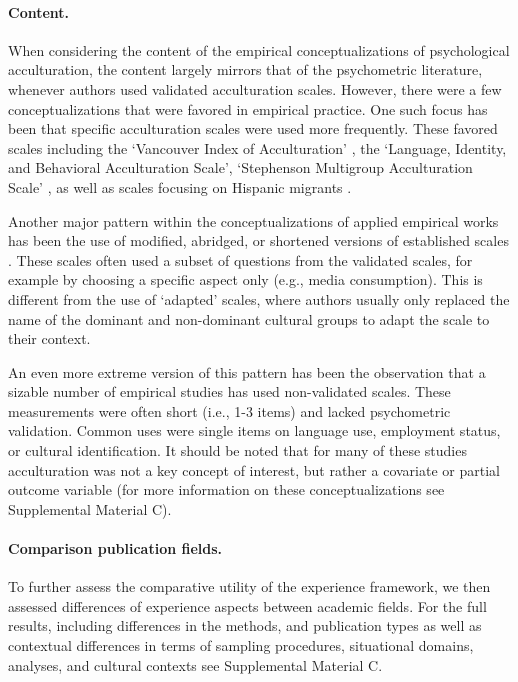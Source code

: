 \documentclass[man, 12pt, a4paper, mask]{apa7}
\begin{document}
\paragraph{Content.}

When considering the content of the empirical conceptualizations of
psychological acculturation, the content largely mirrors that of the
psychometric literature, whenever authors used validated acculturation
scales. However, there were a few conceptualizations that were favored
in empirical practice. One such focus has been that specific
acculturation scales were used more frequently. These favored scales
including the `Vancouver Index of Acculturation' \citep[][]{Ryder2000},
the `Language, Identity, and Behavioral Acculturation Scale',
`Stephenson Multigroup Acculturation Scale' \citep[][]{Stephenson2000},
as well as scales focusing on Hispanic migrants
\citep[][]{Cuellar1995a, Marin1987, Marin1987}.

Another major pattern within the conceptualizations of applied empirical
works has been the use of modified, abridged, or shortened versions of
established scales \citep[e.g.,][]{Green2014,Im2009}. These scales often
used a subset of questions from the validated scales, for example by
choosing a specific aspect only (e.g., media consumption). This is
different from the use of `adapted' scales, where authors usually only
replaced the name of the dominant and non-dominant cultural groups to
adapt the scale to their context.

An even more extreme version of this pattern has been the observation
that a sizable number of empirical studies has used non-validated
scales. These measurements were often short (i.e., 1-3 items) and lacked
psychometric validation. Common uses were single items on language use,
employment status, or cultural identification. It should be noted that
for many of these studies acculturation was not a key concept of
interest, but rather a covariate or partial outcome variable (for more
information on these conceptualizations see Supplemental Material C).

\paragraph{Comparison publication fields.}

To further assess the comparative utility of the experience framework,
we then assessed differences of experience aspects between academic
fields. For the full results, including differences in the methods, and
publication types as well as contextual differences in terms of sampling
procedures, situational domains, analyses, and cultural contexts see
Supplemental Material C.
\end{document}
